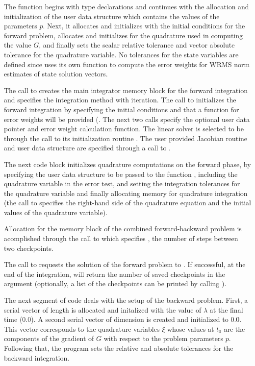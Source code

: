 The  function begins with type declarations and continues with the
allocation and initialization of the user data structure which contains the values 
of the parameters $p$. Next, it allocates and
initializes  with the initial conditions for the forward problem, allocates and 
initializes  for the quadrature used in computing the value $G$, and finally
sets the scalar relative tolerance  and vector absolute tolerance 
for the quadrature variable. No tolerances for the state variables are defined since
 uses its own function to compute the error weights for WRMS norm
estimates of state solution vectors.

The call to  creates the main integrator memory block for the 
forward integration and specifies the  integration method with 
 iteration. 
The call to  initializes the forward integration by specifying the 
initial conditions and that a function for error weights will be provided (. 
The next two calls specify the optional user data pointer and error weight calculation
function.
The linear solver is selected to be {\cvdense} through the call to its 
initialization routine . The user provided Jacobian routine 
and user data structure  are specified through a call to .

The next code block initializes quadrature computations on the forward phase, by
specifying the user data structure to be passed to the function ,
including the quadrature variable in the error test, and setting the integration tolerances
for the quadrature variable and finally allocating {\cvodes} memory for quadrature
integration (the call to  specifies the right-hand side
of the quadrature equation and the initial values of the quadrature variable).

Allocation for the memory block of the combined forward-backward problem is
acomplished through the call to  which specifies ,
the number of steps between two checkpoints.

The call to  requests the solution of the forward problem to .
If successful, at the end of the integration,  will return the number
of saved checkpoints in the argument  (optionally, a list of the checkpoints
can be printed by calling ).

The next segment of code deals with the setup of the backward problem. 
First, a serial vector  of length  is allocated and initalized with the
value of $\lambda$ at the final time ($0.0$). 
A second serial vector  of dimension  is created and initialized to $0.0$.
This vector corresponds to the quadrature variables $\xi$ whose values at $t_0$ 
are the components of the gradient of $G$ with respect to the problem parameters $p$.
Following that, the program sets the relative and absolute tolerances for the backward integration.

